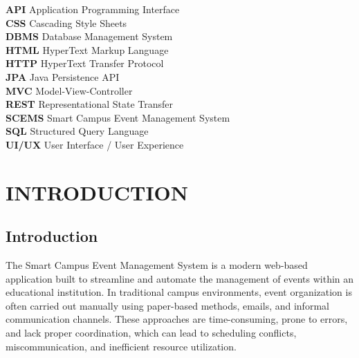 \documentclass[10pt]{report}
\begin{document}
\begin{flushleft}

\textbf{API} \hspace{1.8cm} Application Programming Interface \\[0.3cm]
\textbf{CSS} \hspace{1.8cm} Cascading Style Sheets \\[0.3cm]
\textbf{DBMS} \hspace{1.4cm} Database Management System \\[0.3cm]
\textbf{HTML} \hspace{1.5cm} HyperText Markup Language \\[0.3cm]
\textbf{HTTP} \hspace{1.5cm} HyperText Transfer Protocol \\[0.3cm]
\textbf{JPA} \hspace{1.8cm} Java Persistence API \\[0.3cm]
\textbf{MVC} \hspace{1.8cm} Model-View-Controller \\[0.3cm]
\textbf{REST} \hspace{1.5cm} Representational State Transfer \\[0.3cm]
\textbf{SCEMS} \hspace{1cm} Smart Campus Event Management System \\[0.3cm]
\textbf{SQL} \hspace{1.8cm} Structured Query Language \\[0.3cm]
\textbf{UI/UX} \hspace{1.3cm} User Interface / User Experience \\

\end{flushleft}
\renewcommand*\contentsname{TABLE OF CONTENTS} 
   
\tableofcontents 

\thispagestyle{empty} 
 
\chapter{INTRODUCTION} 
\section{Introduction}
	The Smart Campus Event Management System is a modern web-based application built to streamline and automate the management of events within an educational institution. In traditional campus environments, event organization is often carried out manually using paper-based methods, emails, and informal communication channels. These approaches are time-consuming, prone to errors, and lack proper coordination, which can lead to scheduling conflicts, miscommunication, and inefficient resource utilization. 
\end{document}
